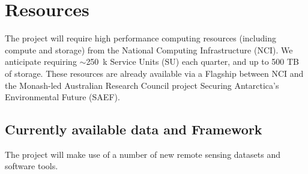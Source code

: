 \chapter{Resources}

The project will require high performance computing resources (including compute and storage) from the National Computing Infrastructure (NCI). We anticipate requiring $\sim$250~k Service Units (SU) each quarter, and up to 500 TB of storage. These resources are already available via a Flagship between NCI and the Monash-led Australian Research Council project Securing Antarctica’s Environmental Future (SAEF).

\section*{Currently available data and Framework}\label{data}
The project will make use of a number of new remote sensing datasets and software tools.

